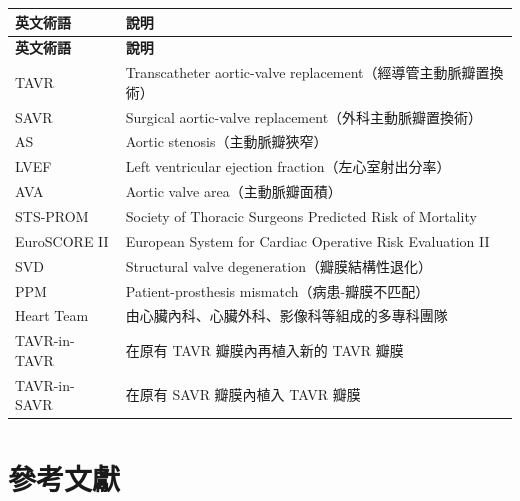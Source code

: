 \documentclass[12pt,a4paper]{article}
\begin{document}
\begin{longtable}{p{4.5cm}p{9.5cm}}
\toprule
\textbf{英文術語} & \textbf{說明} \\
\midrule
\endfirsthead
\toprule
\textbf{英文術語} & \textbf{說明} \\
\midrule
\endhead
\bottomrule
\endfoot
TAVR & Transcatheter aortic-valve replacement（經導管主動脈瓣置換術） \\
\midrule
SAVR & Surgical aortic-valve replacement（外科主動脈瓣置換術） \\
\midrule
AS & Aortic stenosis（主動脈瓣狹窄） \\
\midrule
LVEF & Left ventricular ejection fraction（左心室射出分率） \\
\midrule
AVA & Aortic valve area（主動脈瓣面積） \\
\midrule
STS-PROM & Society of Thoracic Surgeons Predicted Risk of Mortality \\
\midrule
EuroSCORE II & European System for Cardiac Operative Risk Evaluation II \\
\midrule
SVD & Structural valve degeneration（瓣膜結構性退化） \\
\midrule
PPM & Patient-prosthesis mismatch（病患-瓣膜不匹配） \\
\midrule
Heart Team & 由心臟內科、心臟外科、影像科等組成的多專科團隊 \\
\midrule
TAVR-in-TAVR & 在原有 TAVR 瓣膜內再植入新的 TAVR 瓣膜 \\
\midrule
TAVR-in-SAVR & 在原有 SAVR 瓣膜內植入 TAVR 瓣膜 \\
\bottomrule
\end{longtable}

\section{參考文獻}
\end{document}
